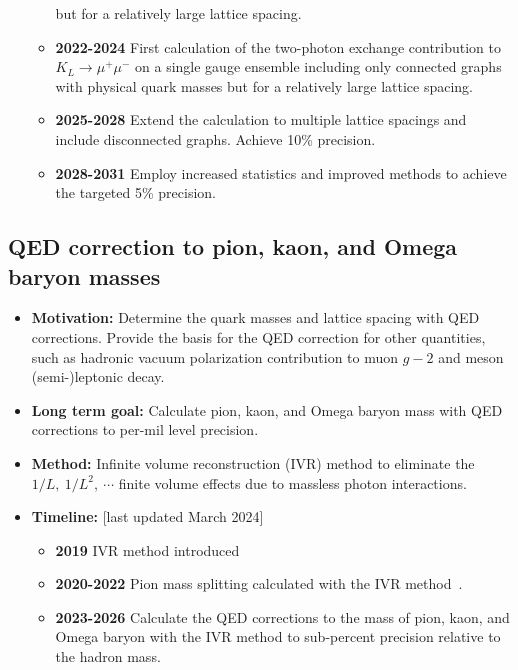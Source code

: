 \documentclass[12pt,hyperpdf]{article}
\begin{document}
\begin{itemize}
\begin{itemize}
    but for a relatively large lattice spacing.~\cite{Zhao:2022pbs, Zhao:2022njd}
    \item{\bf 2022-2024} First calculation of the two-photon exchange contribution 
    to $K_L\to\mu^+ \mu^-$ on a single gauge ensemble including only connected 
    graphs with physical quark masses but for a relatively large lattice spacing.
    \item{\bf 2025-2028} Extend the calculation to multiple lattice spacings and include 
    disconnected graphs.  Achieve 10\% precision.
    \item{\bf 2028-2031} Employ increased statistics and improved methods to 
    achieve the targeted 5\% precision.
\end{itemize}
\end{itemize}


\subsection{QED correction to pion, kaon, and Omega baryon masses}
\begin{itemize}
    \item{\bf Motivation:} Determine the quark masses and lattice spacing with QED corrections. Provide the basis for the QED correction for other quantities, such as hadronic vacuum polarization contribution to muon $g-2$ and meson (semi-)leptonic decay.
    \item{\bf Long term goal:} Calculate pion, kaon, and Omega baryon mass with QED corrections to per-mil level precision.
    \item{\bf Method:}
       Infinite volume reconstruction (IVR) method \cite{Feng:2018qpx} to eliminate
      the $1/L,~1/L^2,~\cdots$ finite volume effects due to massless photon interactions.
\item{\bf Timeline:} \hfill [last updated March 2024]
\begin{itemize}
    \item{\bf 2019} IVR method introduced
    \item{\bf 2020-2022} Pion mass splitting calculated with the IVR method~\cite{Feng:2021zek}.
    \item{\bf 2023-2026} Calculate the QED corrections to the mass of pion, kaon, and Omega baryon with the IVR method to sub-percent precision relative to the hadron mass.
\end{itemize}
\end{itemize}

\end{document}
